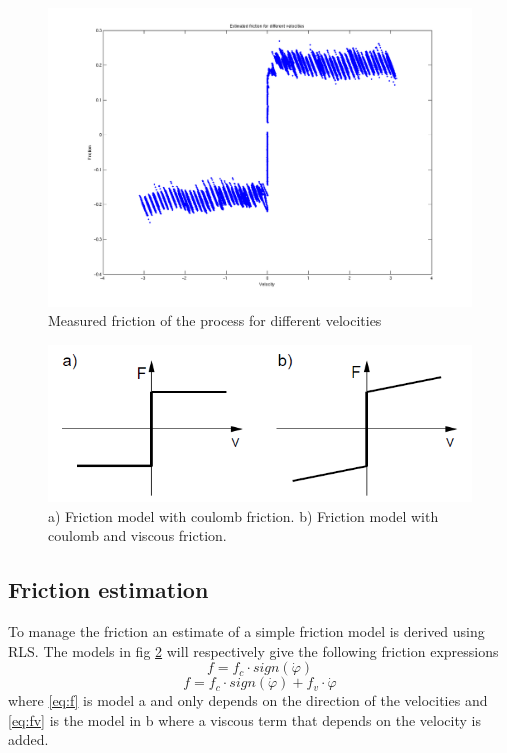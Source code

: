 \documentclass[10pt,a4paper]{article}
\begin{document}
\begin{figure}[!htb]
\centering
\includegraphics[width=1\textwidth]{fric.png}
\caption{Measured friction of the process for different velocities}
\label{fig:fric}
\end{figure}
\begin{figure}[!htb]
\centering
\includegraphics[width=1\textwidth]{frictmodel.png}
\caption{a) Friction model with coulomb friction. b) Friction model with coulomb and viscous friction.}
\label{fig:frictmodel}
\end{figure}
\subsection{Friction estimation}
\label{sec:fricEst}
To manage the friction an estimate of a simple friction model is derived using RLS. The models in fig \ref{fig:frictmodel} will respectively give the following friction expressions 
\begin{equation}
 f=f_c\cdot sign(\dot{\varphi})
 \label{eq:f}
 \end{equation}
\begin{equation}
 f=f_c\cdot sign(\dot{\varphi})+f_v\cdot \dot{\varphi}
 \label{eq:fv}
 \end{equation}
where \ref{eq:f} is model a and only depends on the direction of the velocities and \ref{eq:fv} is the model in b where a viscous term that depends on the velocity is added.
 
\end{document}
